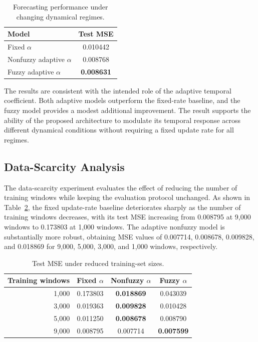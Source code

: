 \documentclass[journal]{IEEEtran}
\begin{document}
	\begin{table}[t]
		\centering
		\caption{Forecasting performance under changing dynamical regimes.}
		\label{tab:regime_shift}
		\begin{tabular}{lc}
			\toprule
			Model & Test MSE \\
			\midrule
			Fixed $\alpha$ & 0.010442 \\
			Nonfuzzy adaptive $\alpha$ & 0.008768 \\
			Fuzzy adaptive $\alpha$ & \textbf{0.008631} \\
			\bottomrule
		\end{tabular}
	\end{table}
	
	The results are consistent with the intended role of the adaptive temporal coefficient. Both adaptive models outperform the fixed-rate baseline, and the fuzzy model provides a modest additional improvement. The result supports the ability of the proposed architecture to modulate its temporal response across different dynamical conditions without requiring a fixed update rate for all regimes.
	
	
	\subsection{Data-Scarcity Analysis}
	\label{subsec:data_scarcity_results}
	
	The data-scarcity experiment evaluates the effect of reducing the number of training windows while keeping the evaluation protocol unchanged. As shown in Table~\ref{tab:data_scarcity}, the fixed update-rate baseline deteriorates sharply as the number of training windows decreases, with its test MSE increasing from 0.008795 at 9,000 windows to 0.173803 at 1,000 windows. The adaptive nonfuzzy model is substantially more robust, obtaining MSE values of 0.007714, 0.008678, 0.009828, and 0.018869 for 9,000, 5,000, 3,000, and 1,000 windows, respectively.
	
	\begin{table}[t]
		\centering
		\caption{Test MSE under reduced training-set sizes.}
		\label{tab:data_scarcity}
		\begin{tabular}{rccc}
			\toprule
			Training windows & Fixed $\alpha$ & Nonfuzzy $\alpha$ & Fuzzy $\alpha$ \\
			\midrule
			1,000 & 0.173803 & \textbf{0.018869} & 0.043039 \\
			3,000 & 0.019363 & \textbf{0.009828} & 0.010428 \\
			5,000 & 0.011250 & \textbf{0.008678} & 0.008790 \\
			9,000 & 0.008795 & 0.007714 & \textbf{0.007599} \\
			\bottomrule
		\end{tabular}
	\end{table}
	
\end{document}
